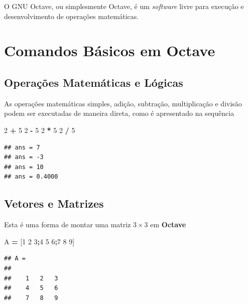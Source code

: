 \documentclass[
]{book}
\newenvironment{Shaded}{\begin{snugshade}}{\end{snugshade}}
\newcommand{\FloatTok}[1]{\textcolor[rgb]{0.00,0.00,0.81}{#1}}
\newcommand{\NormalTok}[1]{#1}
\newcommand{\OperatorTok}[1]{\textcolor[rgb]{0.81,0.36,0.00}{\textbf{#1}}}
\begin{document}
O GNU Octave, ou simplesmente Octave, é um \emph{software} livre para execução e desenvolvimento de operações matemáticas.

\hypertarget{comandos-buxe1sicos-em-octave}{%
\section{Comandos Básicos em Octave}\label{comandos-buxe1sicos-em-octave}}

\hypertarget{operauxe7uxf5es-matemuxe1ticas-e-luxf3gicas}{%
\subsection{Operações Matemáticas e Lógicas}\label{operauxe7uxf5es-matemuxe1ticas-e-luxf3gicas}}

As operações matemáticas simples, adição, subtração, multiplicação e divisão podem ser executadas de maneira direta, como é apresentado na sequência

\begin{Shaded}
\begin{Highlighting}[]
\FloatTok{2} \OperatorTok{+} \FloatTok{5}
\FloatTok{2} \OperatorTok{{-}} \FloatTok{5}
\FloatTok{2} \OperatorTok{*} \FloatTok{5}
\FloatTok{2} \OperatorTok{/} \FloatTok{5}
\end{Highlighting}
\end{Shaded}

\begin{verbatim}
## ans = 7
## ans = -3
## ans = 10
## ans = 0.4000
\end{verbatim}

\hypertarget{vetores-e-matrizes}{%
\subsection{Vetores e Matrizes}\label{vetores-e-matrizes}}

Esta é uma forma de montar uma matriz \(3 \times 3\) em \textbf{Octave}

\begin{Shaded}
\begin{Highlighting}[]
\NormalTok{A }\OperatorTok{=}\NormalTok{ [}\FloatTok{1} \FloatTok{2} \FloatTok{3}\OperatorTok{;}\FloatTok{4} \FloatTok{5} \FloatTok{6}\OperatorTok{;}\FloatTok{7} \FloatTok{8} \FloatTok{9}\NormalTok{]}
\end{Highlighting}
\end{Shaded}

\begin{verbatim}
## A =
## 
##    1   2   3
##    4   5   6
##    7   8   9
\end{verbatim}
\end{document}
